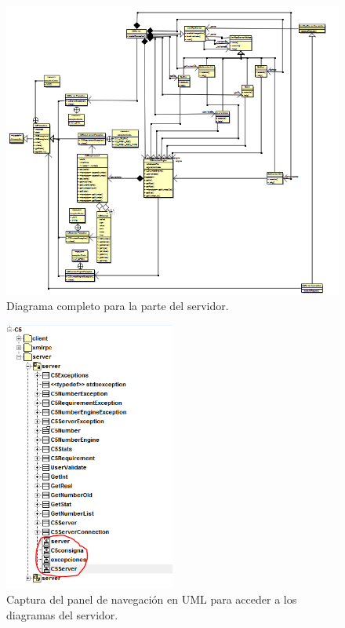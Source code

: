 \documentclass[a4paper,12pt]{article}
\begin{document}
\begin{figure}[htbp]
    \centering
    \includegraphics[width=\textwidth]{C5/Esquema_general_C5_server_todo.PNG}
    \caption{Diagrama completo para la parte del servidor.}
    \label{fig:servidor}
\end{figure}

\begin{figure}[htbp]
    \centering
    \includegraphics[width=0.5\textwidth]{C5/Esquema_general_C5_server_panel.PNG}
    \caption{Captura del panel de navegación en UML para acceder a los diagramas del servidor.}
    \label{fig:navegacion_servidor}
\end{figure}
\end{document}
